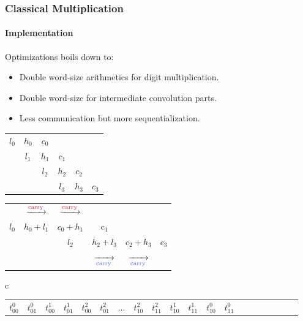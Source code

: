 \begin{frame}[fragile]
  \frametitle{Classical Multiplication}
  \framesubtitle{Implementation}
  Optimizations boils down to:
  \begin{itemize}
  \item Double word-size arithmetics for digit multiplication.
  \item Double word-size for intermediate convolution parts.
  \item Less communication but more sequentialization.
  \end{itemize}\pause
  \begin{center}
  \tiny
  \begin{tabular}{cccccc}
    \color{Crimson}$l_0$ & \color{Crimson}$h_0$ & \color{Crimson}$c_0$ & & & \\
    & \color{Crimson}$l_1$ & \color{Crimson}$h_1$ & \color{Crimson}$c_1$ & & \\
    & & \color{RoyalBlue}$l_2$ & \color{RoyalBlue}$h_2$ & \color{RoyalBlue}$c_2$ & \\
    & & & \color{RoyalBlue}$l_3$ & \color{RoyalBlue}$h_3$ & \color{RoyalBlue}$c_3$
  \end{tabular}
\begin{tabular}{cccccc}
     & $\xrightarrow{\scriptsize \text{\color{Crimson}carry}}$ & $\xrightarrow{\scriptsize \text{\color{Crimson}carry}}$ &  &  &  \\
    \color{Crimson}$l_0$ & \color{Crimson}$h_0 + l_1$ & \color{Crimson}$c_0 + h_1$ & \color{Crimson}c$_1$ & & \\
    & & \color{RoyalBlue}$l_2$ & \color{RoyalBlue}$h_2+l_3$ & \color{RoyalBlue}$c_2+h_3$ & \color{RoyalBlue} $c_3$\\
  & & & $\xrightarrow[\scriptsize \text{\color{RoyalBlue}carry}]{}$ & $\xrightarrow[\scriptsize \text{\color{RoyalBlue}carry}]{}$ & \\
\end{tabular}
\end{center}\pause
  \begin{center}
  \tiny
  \begin{tabular}{c}
    \begin{tabular}{|C{0.3cm}|C{0.3cm}|C{0.3cm}|C{0.3cm}|C{0.3cm}|C{0.3cm}|C{0.3cm}|C{0.3cm}|C{0.3cm}|C{0.3cm}|C{0.3cm}|C{0.3cm}|C{0.3cm}|C{0.43cm}|C{0.3cm}|C{0.3cm}|C{0.3cm}|C{0.3cm}|C{0.3cm}|C{0.3cm}|}
      \hline
      \color{Crimson}$t^0_{00}$ & \color{Crimson}$t^0_{01}$ & \color{RoyalBlue}$t^1_{00}$ & \color{RoyalBlue}$t^1_{01}$  & \color{ForestGreen}$t^2_{00}$ & \color{ForestGreen}$t^2_{01}$  & $\ldots$ & \color{ForestGreen}$t^2_{10}$ & \color{ForestGreen}$t^2_{11}$  & \color{RoyalBlue}$t^1_{10}$ & \color{RoyalBlue}$t^1_{11}$ & \color{Crimson}$t^0_{10}$ & \color{Crimson}$t^0_{11}$ \\

\end{tabular}
\end{tabular}
\end{center}
\end{frame}
